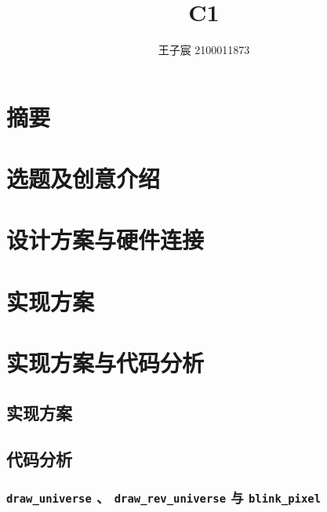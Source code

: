\documentclass[11pt]{article}
\title{C1}
\author{王子宸 2100011873 }
\begin{document}
    
    
    \maketitle
    
    \tableofcontents

    \setcounter{section}{-1}
    \section{摘要}


    \section{选题及创意介绍}


    \section{设计方案与硬件连接}


    \section{实现方案}


    
    \hypertarget{c1-ux751fux547dux6e38ux620fux8fdbux9636}{%
\section{实现方案与代码分析}\label{c1-ux751fux547dux6e38ux620fux8fdbux9636}}

    \subsection{实现方案}
    
    \hypertarget{ux51fdux6570ux5b9aux4e49}{%
    \subsection{代码分析}\label{ux51fdux6570ux5b9aux4e49}}

    \hypertarget{draw_universe-draw_rev_universe-ux4e0e-blink_pixel}{%
\subsubsection{\texorpdfstring{\texttt{draw\_universe} 、
\texttt{draw\_rev\_universe} 与
\texttt{blink\_pixel}}{draw\_universe 、 draw\_rev\_universe 与 blink\_pixel}}\label{draw_universe-draw_rev_universe-ux4e0e-blink_pixel}}
\end{document}
